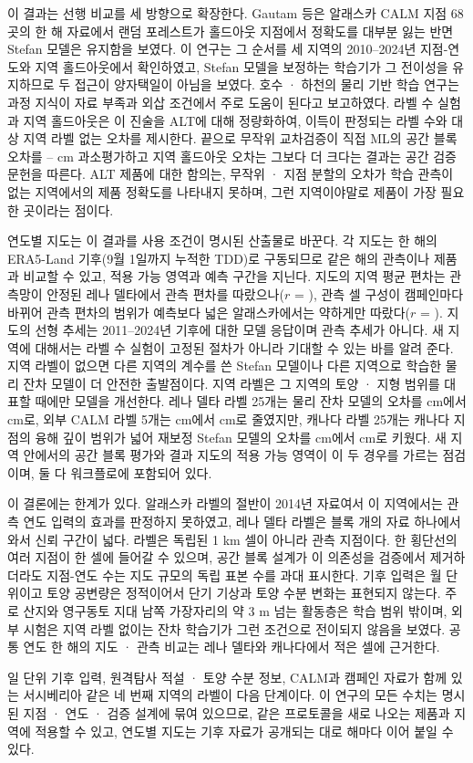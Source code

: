 이 결과는 선행 비교를 세 방향으로 확장한다. Gautam 등\cite{Gautam2025}은 알래스카 CALM 지점 68곳의 한 해 자료에서 랜덤 포레스트가 홀드아웃 지점에서 정확도를 대부분 잃는 반면 Stefan 모델은 유지함을 보였다. 이 연구는 그 순서를 세 지역의 2010--2024년 지점-연도와 지역 홀드아웃에서 확인하였고, Stefan 모델을 보정하는 학습기가 그 전이성을 유지하므로 두 접근이 양자택일이 아님을 보였다. 호수 · 하천의 물리 기반 학습 연구는 과정 지식이 자료 부족과 외삽 조건에서 주로 도움이 된다고 보고하였다\cite{Read2019,Jia2021,Willard2022}. 라벨 수 실험과 지역 홀드아웃은 이 진술을 ALT에 대해 정량화하여, 이득이 판정되는 라벨 수와 대상 지역 라벨 없는 오차를 제시한다. 끝으로 무작위 교차검증이 직접 ML의 공간 블록 오차를 \noptimLeDz--\noptimCaDz{} cm 과소평가하고 지역 홀드아웃 오차는 그보다 더 크다는 결과는 공간 검증 문헌\cite{Roberts2017,Ploton2020,MeyerPebesma2022}을 따른다. ALT 제품에 대한 함의는, 무작위 · 지점 분할의 오차가 학습 관측이 없는 지역에서의 제품 정확도를 나타내지 못하며, 그런 지역이야말로 제품이 가장 필요한 곳이라는 점이다.

연도별 지도는 이 결과를 사용 조건이 명시된 산출물로 바꾼다. 각 지도는 한 해의 ERA5-Land 기후(9월 1일까지 누적한 TDD)로 구동되므로 같은 해의 관측이나 제품과 비교할 수 있고, 적용 가능 영역과 예측 구간을 지닌다. 지도의 지역 평균 편차는 관측망이 안정된 레나 델타에서 관측 편차를 따랐으나($r$ = \nanobsrLe), 관측 셀 구성이 캠페인마다 바뀌어 관측 편차의 범위가 예측보다 넓은 알래스카에서는 약하게만 따랐다($r$ = \nanobsrAk). 지도의 선형 추세는 2011--2024년 기후에 대한 모델 응답이며 관측 추세가 아니다. 새 지역에 대해서는 라벨 수 실험이 고정된 절차가 아니라 기대할 수 있는 바를 알려 준다. 지역 라벨이 없으면 다른 지역의 계수를 쓴 Stefan 모델이나 다른 지역으로 학습한 물리 잔차 모델이 더 안전한 출발점이다. 지역 라벨은 그 지역의 토양 · 지형 범위를 대표할 때에만 모델을 개선한다. 레나 델타 라벨 25개는 물리 잔차 모델의 오차를 \ntlrmseLeRszero{} cm에서 \ntlrmseLeRstwfive{} cm로, 외부 CALM 라벨 5개는 \nftAllRszero{} cm에서 \nftAllRsfive{} cm로 줄였지만, 캐나다 라벨 25개는 캐나다 지점의 융해 깊이 범위가 넓어 재보정 Stefan 모델의 오차를 \ntlrmseCaPzzero{} cm에서 \ntlrmseCaPntwfive{} cm로 키웠다. 새 지역 안에서의 공간 블록 평가와 결과 지도의 적용 가능 영역이 이 두 경우를 가르는 점검이며, 둘 다 워크플로에 포함되어 있다.

이 결론에는 한계가 있다. 알래스카 라벨의 절반이 2014년 자료여서 이 지역에서는 관측 연도 입력의 효과를 판정하지 못하였고, 레나 델타 라벨은 블록 \nnblkLe{}개의 자료 하나에서 와서 신뢰 구간이 넓다. 라벨은 독립된 1 km 셀이 아니라 관측 지점이다. 한 횡단선의 여러 지점이 한 셀에 들어갈 수 있으며, 공간 블록 설계가 이 의존성을 검증에서 제거하더라도 지점-연도 수는 지도 규모의 독립 표본 수를 과대 표시한다. 기후 입력은 월 단위이고 토양 공변량은 정적이어서 단기 기상과 토양 수분 변화는 표현되지 않는다. 주로 산지와 영구동토 지대 남쪽 가장자리의 약 3 m 넘는 활동층은 학습 범위 밖이며, 외부 시험은 지역 라벨 없이는 잔차 학습기가 그런 조건으로 전이되지 않음을 보였다. 공통 연도 한 해의 지도 · 관측 비교는 레나 델타와 캐나다에서 적은 셀에 근거한다.

일 단위 기후 입력, 원격탐사 적설 · 토양 수분 정보, CALM과 캠페인 자료가 함께 있는 서시베리아 같은 네 번째 지역의 라벨이 다음 단계이다. 이 연구의 모든 수치는 명시된 지점 · 연도 · 검증 설계에 묶여 있으므로, 같은 프로토콜을 새로 나오는 제품과 지역에 적용할 수 있고, 연도별 지도는 기후 자료가 공개되는 대로 해마다 이어 붙일 수 있다.
